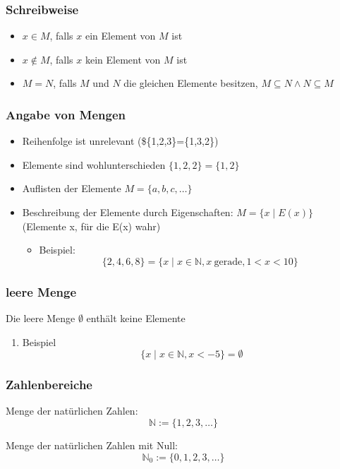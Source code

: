 \documentclass[11pt]{article}
\begin{document}
\subsubsection{Schreibweise}
\label{sec-2-4-1}
\begin{itemize}
\item $x\in M$, falls $x$ ein Element von $M$ ist
\item $x\not\in M$, falls $x$ kein Element von $M$ ist
\item $M=N$, falls $M$ und $N$ die gleichen Elemente besitzen, $M\subseteq N \wedge N\subseteq M$
\end{itemize}

\subsubsection{Angabe von Mengen}
\label{sec-2-4-2}
\begin{itemize}
\item Reihenfolge ist unrelevant (\$\{1,2,3\}=\{1,3,2\})
\item Elemente sind wohlunterschieden $\{1,2,2\} = \{1,2\}$
\item Auflisten der Elemente $M=\{a,b,c,\ldots\}$
\item Beschreibung der Elemente durch Eigenschaften: $M=\{x\mid E(x)\}$ \\
     (Elemente x, für die E(x) wahr)
\begin{itemize}
\item Beispiel:
\[\{2,4,6,8\} = \{x\mid x\in\mathbb{N}, x~\text{gerade}, 1 < x < 10\}\]
\end{itemize}
\end{itemize}
\subsubsection{leere Menge}
\label{sec-2-4-3}
Die leere Menge $\emptyset$ enthält keine Elemente
\begin{enumerate}
\item Beispiel
\label{sec-2-4-3-1}
\[\{x\mid x\in\mathbb{N}, x < -5\} = \emptyset\]
\end{enumerate}

\subsubsection{Zahlenbereiche}
\label{sec-2-4-4}
Menge der natürlichen Zahlen:
\[\mathbb{N} := \{1,2,3,\ldots\}\]

Menge der natürlichen Zahlen mit Null:
\[\mathbb{N}_0 := \{0, 1,2,3,\ldots\}\]
\end{document}
